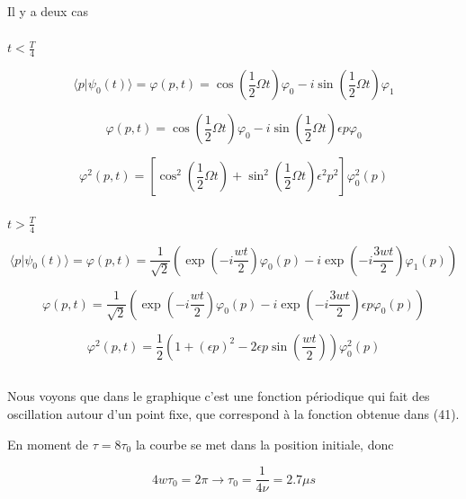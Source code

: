 \documentclass[a4paper,12pt]{article}
\begin{document}
\subsection{}
Il y a deux cas 

\subsubsection{}
$t < \frac T 4$



\begin{equation}
	\langle p|\psi_0(t)\rangle = \varphi(p, t) = \cos\left(\frac 12\Omega t\right)\varphi_0-i \sin\left(\frac 12\Omega t\right)\varphi_1
\end{equation}

\begin{equation}
	 \varphi(p, t) = \cos\left(\frac 12\Omega t\right)\varphi_0-i \sin\left(\frac 12\Omega t\right)\epsilon p \varphi_0
\end{equation}

\begin{equation}
	\varphi^2(p, t) =\left[\cos^2\left(\frac 12\Omega t\right)+\sin^2\left(\frac 12\Omega t\right)\epsilon^2 p^2 \right]\varphi^2_0(p)
\end{equation}

\subsubsection{}
$t > \frac T 4$

\begin{equation}
	\langle p|\psi_0(t)\rangle = \varphi(p, t) = \frac{1}{\sqrt 2}(\exp(-i\frac{wt}{2})\varphi_0(p) - i\exp(-i\frac{3wt}{2})\varphi_1(p))
\end{equation}

\begin{equation}
	\varphi(p, t) = \frac{1}{\sqrt 2}(\exp(-i\frac{wt}{2})\varphi_0(p) - i\exp(-i\frac{3wt}{2})\epsilon p\varphi_0(p))
\end{equation}


\begin{equation}
	\varphi^2(p, t) =\frac{1}{2}\left(1+(\epsilon p)^2 - 2\epsilon p \sin\left(\frac {wt} 2\right)\right) \varphi^2_0(p)
\end{equation}

\subsection{}

Nous voyons que dans le graphique c'est une fonction périodique qui fait des oscillation autour d'un point fixe, que correspond à la fonction obtenue dans (41). 

En moment de $\tau = 8\tau_0$ la courbe se met dans la position initiale, donc 

\begin{equation}\label{key}
	4w\tau_0 = 2\pi \rightarrow \tau_0 = \frac {1} {4\nu} = 2.7\mu s
\end{equation}
\end{document}
